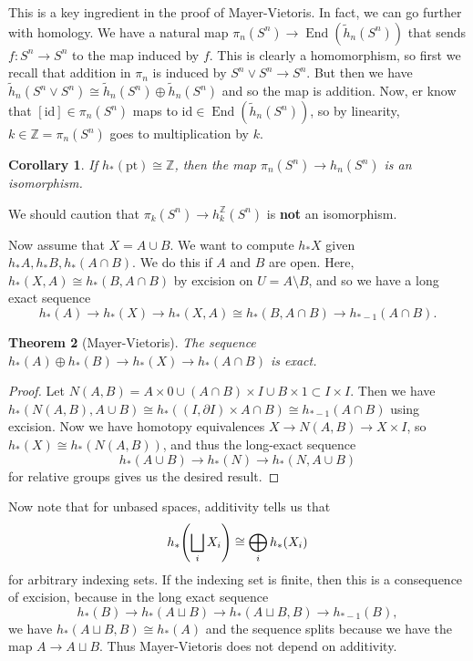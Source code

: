 \documentclass[leqno, openany]{memoir}
\newtheorem{thm}{Theorem}[section]
\newtheorem{cor}[thm]{Corollary}
\theoremstyle{definition}
\theoremstyle{remark}
\theoremstyle{plain}
\theoremstyle{definition}
\theoremstyle{remark}
\newcommand{\Z}{\mathbb{Z}}
\newcommand{\mr}[1]{\mathrm{#1}}
\newcommand{\wt}[1]{\widetilde{#1}}
\DeclareMathOperator{\End}{End}
\begin{document}
This is a key ingredient in the proof of Mayer-Vietoris. In fact, we can go further with homology. We have a natural map $\pi_n(S^n)\to \End(\wt{h}_n(S^n))$ that sends $f \colon S^n \to S^n$ to the map induced by $f$. This is clearly a homomorphism, so first we recall that addition in $\pi_n$ is induced by $S^n \vee S^n \to S^n$. But then we have $\wt{h}_n(S^n \vee S^n) \cong \wt{h}_n(S^n) \oplus \wt{h}_n(S^n)$ and so the map is addition. Now, er know that $[\mr{id}] \in \pi_n(S^n)$ maps to $\mr{id} \in \End(\wt{h}_n(S^n))$, so by linearity, $k \in \Z = \pi_n(S^n)$ goes to multiplication by $k$.

\begin{cor}
    If $h_*(\mr{pt}) \cong \Z$, then the map $\pi_n(S^n) \to h_n(S^n)$ is an isomorphism.
\end{cor}

We should caution that $\pi_k(S^n) \to h_k^{\Z}(S^n)$ is \textbf{not} an isomorphism.

Now assume that $X = A \cup B$. We want to compute $h_* X$ given $h_* A, h_* B, h_*(A \cap B)$. We do this if $A$ and $B$ are open. Here, $h_*(X,A) \cong h_*(B, A \cap B)$ by excision on $U = A \setminus B$, and so we have a long exact sequence
\[ h_*(A) \to h_*(X) \to h_*(X,A) \cong h_*(B, A \cap B) \to h_{*-1}(A \cap B). \]

\begin{thm}[Mayer-Vietoris]
    The sequence $h_*(A) \oplus h_*(B) \to h_*(X) \to h_*(A \cap B)$ is exact.
\end{thm}

\begin{proof}
    Let $N(A,B) = A \times 0 \cup (A \cap B) \times I \cup B \times 1 \subset I \times I$. Then we have $h_*(N(A,B), A \cup B) \cong h_*((I, \partial I) \times A \cap B) \cong h_{*-1}(A \cap B)$ using excision. Now we have homotopy equivalences $X \to N(A,B) \to X \times I$, so $h_*(X) \cong h_*(N(A,B))$, and thus the long-exact sequence
    \[ h_*(A \cup B) \to h_*(N) \to h_*(N, A \cup B) \]
    for relative groups gives us the desired result.
\end{proof}

Now note that for unbased spaces, additivity tells us that 
\[ h_*\qty(\bigsqcup_i X_i) \cong \bigoplus_i h_*(X_i) \]
for arbitrary indexing sets. If the indexing set is finite, then this is a consequence of excision, because in the long exact sequence
\[ h_*(B) \to h_*(A \sqcup B) \to h_*(A \sqcup B, B) \to h_{*-1}(B), \]
we have $h_*(A \sqcup B, B) \cong h_*(A)$ and the sequence splits because we have the map $A \to A \sqcup B$. Thus Mayer-Vietoris does not depend on additivity.
\end{document}
